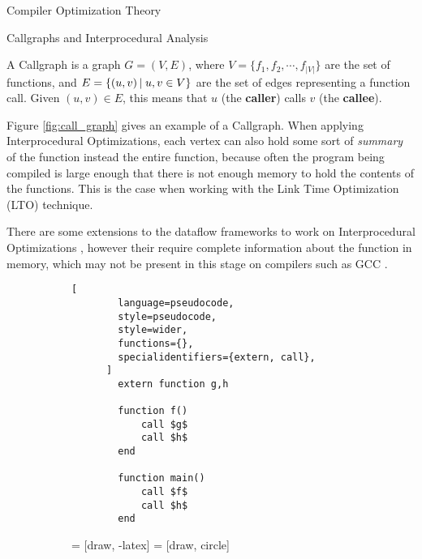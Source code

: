 \begin{section}{Compiler Optimization Theory}
\begin{subsection}{Callgraphs and Interprocedural Analysis}
\begin{definition}
	A Callgraph is a graph $G = (V, E)$, where $V = \{f_1, f_2, \cdots, f_{|V|}\}$
	are the set of functions, and $E = \{(u, v)\,|\;u, v \in V\}$ are the set
	of edges representing a function call. Given $(u, v) \in E$, this means
	that $u$ (the \textbf{caller}) calls $v$ (the \textbf{callee}).
\end{definition}

Figure \ref{fig:call_graph} gives an example of a Callgraph. When applying
Interprocedural Optimizations, each vertex can also hold some sort of
\textit{summary} of the function instead the entire function, because often
the program being compiled is large enough that there is not enough memory
to hold the contents of the functions. This is the case when working with
the Link Time Optimization (LTO) technique.

There are some extensions to the dataflow frameworks to work on Interprocedural
Optimizations \citep{khedker2009data}, however their require complete information
about the function in memory, which may not be present in this stage on compilers
such as GCC \citep{gcc_ipa}.

\begin{figure}[ht]
\centering
  \begin{subfigure}[b]{0.40\textwidth}
      \begin{lstlisting}[
        language=pseudocode,
        style=pseudocode,
        style=wider,
        functions={},
        specialidentifiers={extern, call},
      ]
        extern function g,h

        function f()
            call $g$
            call $h$
        end

        function main()
            call $f$
            call $h$
        end
      \end{lstlisting}
  \end{subfigure}
  \begin{subfigure}[b]{0.40\textwidth}
     = [draw, -latex]
     = [draw, circle]
    \begin{center}
\end{center}
\end{subfigure}
\end{figure}
\end{subsection}
\end{section}
